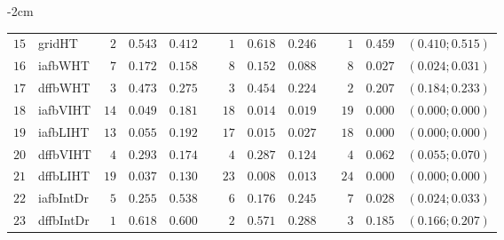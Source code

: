 \begin{table*}[!htbp]
\begin{adjustwidth*}{}{-2cm}
\begin{tabular}{@{}rlrrrrrrrrrcc@{}}
\footnotesize{$15$} & \footnotesize{gridHT   } & \footnotesize{$2 $} & \footnotesize{$0.543$} & \footnotesize{$0.412$} && \footnotesize{$1 $} & \footnotesize{$0.618$} & \footnotesize{$0.246$} && \footnotesize{$1 $} & \footnotesize{$0.459$} & \footnotesize{$(0.410;0.515)$} \\
\footnotesize{$16$} & \footnotesize{iafbWHT  } & \footnotesize{$7 $} & \footnotesize{$0.172$} & \footnotesize{$0.158$} && \footnotesize{$8 $} & \footnotesize{$0.152$} & \footnotesize{$0.088$} && \footnotesize{$8 $} & \footnotesize{$0.027$} & \footnotesize{$(0.024;0.031)$} \\
\footnotesize{$17$} & \footnotesize{dffbWHT  } & \footnotesize{$3 $} & \footnotesize{$0.473$} & \footnotesize{$0.275$} && \footnotesize{$3 $} & \footnotesize{$0.454$} & \footnotesize{$0.224$} && \footnotesize{$2 $} & \footnotesize{$0.207$} & \footnotesize{$(0.184;0.233)$} \\
\footnotesize{$18$} & \footnotesize{iafbVIHT } & \footnotesize{$14$} & \footnotesize{$0.049$} & \footnotesize{$0.181$} && \footnotesize{$18$} & \footnotesize{$0.014$} & \footnotesize{$0.019$} && \footnotesize{$19$} & \footnotesize{$0.000$} & \footnotesize{$(0.000;0.000)$} \\
\footnotesize{$19$} & \footnotesize{iafbLIHT } & \footnotesize{$13$} & \footnotesize{$0.055$} & \footnotesize{$0.192$} && \footnotesize{$17$} & \footnotesize{$0.015$} & \footnotesize{$0.027$} && \footnotesize{$18$} & \footnotesize{$0.000$} & \footnotesize{$(0.000;0.000)$} \\
\footnotesize{$20$} & \footnotesize{dffbVIHT } & \footnotesize{$4 $} & \footnotesize{$0.293$} & \footnotesize{$0.174$} && \footnotesize{$4 $} & \footnotesize{$0.287$} & \footnotesize{$0.124$} && \footnotesize{$4 $} & \footnotesize{$0.062$} & \footnotesize{$(0.055;0.070)$} \\
\footnotesize{$21$} & \footnotesize{dffbLIHT } & \footnotesize{$19$} & \footnotesize{$0.037$} & \footnotesize{$0.130$} && \footnotesize{$23$} & \footnotesize{$0.008$} & \footnotesize{$0.013$} && \footnotesize{$24$} & \footnotesize{$0.000$} & \footnotesize{$(0.000;0.000)$} \\
\footnotesize{$22$} & \footnotesize{iafbIntDr} & \footnotesize{$5 $} & \footnotesize{$0.255$} & \footnotesize{$0.538$} && \footnotesize{$6 $} & \footnotesize{$0.176$} & \footnotesize{$0.245$} && \footnotesize{$7 $} & \footnotesize{$0.028$} & \footnotesize{$(0.024;0.033)$} \\
\footnotesize{$23$} & \footnotesize{dffbIntDr} & \footnotesize{$1 $} & \footnotesize{$0.618$} & \footnotesize{$0.600$} && \footnotesize{$2 $} & \footnotesize{$0.571$} & \footnotesize{$0.288$} && \footnotesize{$3 $} & \footnotesize{$0.185$} & \footnotesize{$(0.166;0.207)$} \\

\end{tabular}
\end{adjustwidth*}
\end{table*}
